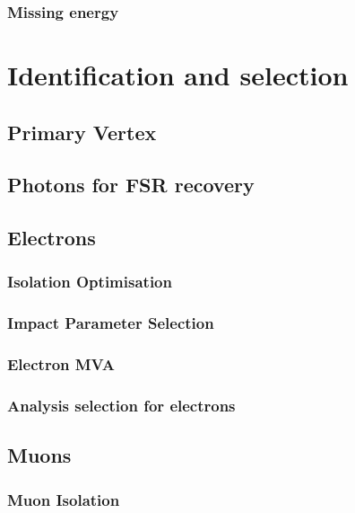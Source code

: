 \subsubsection{Missing energy}


\section{Identification and selection}
\subsection{Primary Vertex}


\subsection{Photons for FSR recovery}
\label{sec:FSRphotons}


\subsection{Electrons}
\subsubsection{Isolation Optimisation}
\label{sec:eleiso}

\subsubsection{Impact Parameter Selection}
\label{sec:eleSIP}

\subsubsection{Electron MVA}
\label{sec:eleMVA}

\subsubsection{Analysis selection for electrons}%
\label{sec:ele_selection}


\subsection{Muons}
\subsubsection{Muon Isolation}
\label{sec:muoniso}


